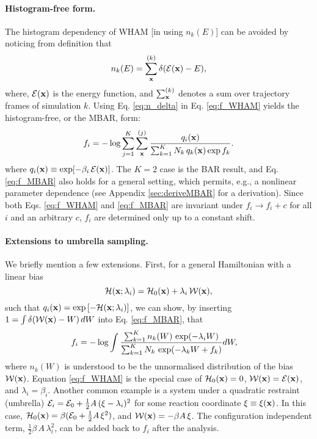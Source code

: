 \documentclass{gMOS2e}
\begin{document}
\paragraph*{Histogram-free form.}



The histogram dependency of WHAM
[in using $n_k(E)$]
can be avoided
by noticing from definition that\cite{
souaille2001}
%
\begin{equation}
n_k(E)
=
\sum_{\mathbf{x}}^{(k)} \delta(\mathcal{E}(\mathbf{x}) - E),
\label{eq:n_delta}
\end{equation}
%
where,
$\mathcal{E}(\mathbf{x})$
is the energy function,
and
$\sum_{\mathbf{x}}^{(k)}$
denotes a sum over trajectory frames
of simulation $k$.
%
%
%
Using Eq. \eqref{eq:n_delta}
in Eq. \eqref{eq:f_WHAM} yields
the histogram-free, or the MBAR, form\cite{
kumar1992, souaille2001, shirts2008}:
%
\begin{equation}
f_i
=
-\log
\sum_{j = 1}^K
\sum_{\mathbf{x}}^{(j)}
\frac{
  q_i(\mathbf{x})
}
{
  \sum_{k = 1}^K N_k \, q_k(\mathbf{x}) \exp f_k
}.
\label{eq:f_MBAR}
\end{equation}
%
where
$q_i(\mathbf{x}) \equiv \exp[ -\beta_i \, \mathcal{E}(\mathbf{x}) ]$.
%
The $K = 2$ case is the BAR result\cite{
bennett1976},
and Eq. \eqref{eq:f_MBAR}
also holds for a general setting, which permits, e.g., a nonlinear parameter dependence
(see Appendix \ref{sec:deriveMBAR}
for a derivation).
%
Since both Eqs. \eqref{eq:f_WHAM} and \eqref{eq:f_MBAR}
are invariant under $f_i \rightarrow f_i + c$
for all $i$ and an arbitrary $c$,
$f_i$ are determined only up to a constant shift.



\paragraph*{
Extensions to umbrella sampling.}



We briefly mention a few extensions.
%
First,
for a general Hamiltonian
with a linear bias
\[
\mathcal{H}(\mathbf{x}; \lambda_i) = \mathcal{H}_0(\mathbf{x}) + \lambda_i \, \mathcal{W}(\mathbf{x}),
\]
such that $q_i(\mathbf{x}) = \exp\left[ -\mathcal{H}(\mathbf{x}; \lambda_i) \right]$,
%
we can show,
by inserting
$1 = \int \delta(\mathcal{W}(\mathbf{x}) - W) \, dW$
into Eq. \eqref{eq:f_MBAR},
that
%
\begin{align}
f_i
&=
-\log
  \int
    \frac{
      \sum_{k = 1}^K n_k(W) \, \exp(-\lambda_i W)
    }
    {
      \sum_{k = 1}^K N_k \, \exp(-\lambda_k W + f_k)
    }
    d W,
\notag
\end{align}
%
where
$n_k(W)$
is understood to be
the unnormalised distribution of
the bias $\mathcal{W}(\mathbf{x})$.
%
Equation \eqref{eq:f_WHAM}
is the special case of
$\mathcal{H}_0(\mathbf{x}) = 0$,
$\mathcal{W}(\mathbf{x}) = \mathcal{E}(\mathbf{x})$,
and $\lambda_i = \beta_i$.
%
Another common example
is a system under a quadratic restraint (umbrella)
$\mathcal{E}_i = \mathcal{E}_0 + \frac 1 2 A \, (\xi - \lambda_i)^2$
for some reaction coordinate $\xi \equiv \xi(\mathbf{x})$.
%
In this case,
$\mathcal{H}_0(\mathbf{x}) = \beta (\mathcal{E}_0 + \frac 1 2 A \, \xi^2)$,
and
$\mathcal{W}(\mathbf{x}) = -\beta A \, \xi$.
%
The configuration independent term,
$\frac 1 2 \beta \, A \, \lambda_i^2$,
can be added back to $f_i$ after the analysis.
\end{document}
